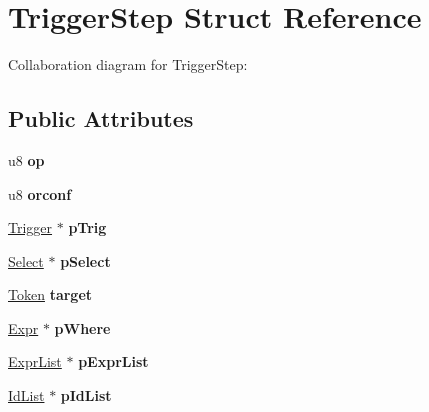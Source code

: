 \hypertarget{struct_trigger_step}{\section{Trigger\+Step Struct Reference}
\label{struct_trigger_step}
}


Collaboration diagram for Trigger\+Step\+:
\subsection*{Public Attributes}
\begin{DoxyCompactItemize}
\item 
\hypertarget{struct_trigger_step_a20269855c80d869d498fcb93401832fd}{u8 {\bfseries op}}\label{struct_trigger_step_a20269855c80d869d498fcb93401832fd}

\item 
\hypertarget{struct_trigger_step_a4ed8b2571fde96e84f637184453e73e3}{u8 {\bfseries orconf}}\label{struct_trigger_step_a4ed8b2571fde96e84f637184453e73e3}

\item 
\hypertarget{struct_trigger_step_a70671e85796776db06c732ab6ae4ae0d}{\hyperlink{struct_trigger}{Trigger} $\ast$ {\bfseries p\+Trig}}\label{struct_trigger_step_a70671e85796776db06c732ab6ae4ae0d}

\item 
\hypertarget{struct_trigger_step_a90bf3353653cedf364a7fb2eb89a19c4}{\hyperlink{struct_select}{Select} $\ast$ {\bfseries p\+Select}}\label{struct_trigger_step_a90bf3353653cedf364a7fb2eb89a19c4}

\item 
\hypertarget{struct_trigger_step_a8b860bb5f466b1522125d446b58d860a}{\hyperlink{struct_token}{Token} {\bfseries target}}\label{struct_trigger_step_a8b860bb5f466b1522125d446b58d860a}

\item 
\hypertarget{struct_trigger_step_ad4c293b04dfda535f3aad5b9e02726c7}{\hyperlink{struct_expr}{Expr} $\ast$ {\bfseries p\+Where}}\label{struct_trigger_step_ad4c293b04dfda535f3aad5b9e02726c7}

\item 
\hypertarget{struct_trigger_step_a607602af65ecf6c7e6cac4ea8532ac1d}{\hyperlink{struct_expr_list}{Expr\+List} $\ast$ {\bfseries p\+Expr\+List}}\label{struct_trigger_step_a607602af65ecf6c7e6cac4ea8532ac1d}

\item 
\hypertarget{struct_trigger_step_a6b91bf578544104f8bd4bd5b958ddd8c}{\hyperlink{struct_id_list}{Id\+List} $\ast$ {\bfseries p\+Id\+List}}\label{struct_trigger_step_a6b91bf578544104f8bd4bd5b958ddd8c}


\end{DoxyCompactItemize}
